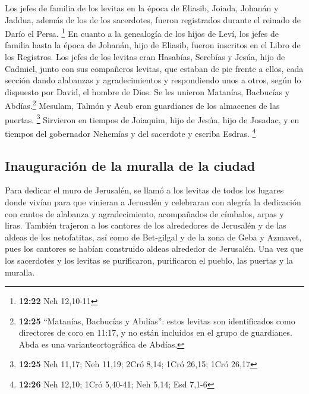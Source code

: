  Los jefes de familia de los levitas en la época de
Eliasib, Joiada, Johanán y Jaddua, además de los de los sacerdotes,
fueron registrados durante el reinado de Darío el Persa. \footnote{\textbf{12:22}
  Neh 12,10-11}  En cuanto a la genealogía de los hijos
de Leví, los jefes de familia hasta la época de Johanán, hijo de
Eliasib, fueron inscritos en el Libro de los Registros. 
Los jefes de los levitas eran Hasabías, Serebías y Jesúa, hijo de
Cadmiel, junto con sus compañeros levitas, que estaban de pie frente a
ellos, cada sección dando alabanzas y agradecimientos y respondiendo
unos a otros, según lo dispuesto por David, el hombre de Dios.
 Se les unieron Matanías, Bacbucías y Abdías.\footnote{\textbf{12:25}
  ``Matanías, Bacbucías y Abdías'': estos levitas son identificados como
  directores de coro en 11:17, y no están incluidos en el grupo de
  guardianes. Abda es una varianteortográfica de Abdías.} Mesulam,
Talmón y Acub eran guardianes de los almacenes de las puertas.
\footnote{\textbf{12:25} Neh 11,17; Neh 11,19; 2Cró 8,14; 1Cró 26,15;
  1Cró 26,17}  Sirvieron en tiempos de Joiaquim, hijo de
Jesúa, hijo de Josadac, y en tiempos del gobernador Nehemías y del
sacerdote y escriba Esdras. \footnote{\textbf{12:26} Neh 12,10; 1Cró
  5,40-41; Neh 5,14; Esd 7,1-6}

\hypertarget{inauguraciuxf3n-de-la-muralla-de-la-ciudad}{%
\subsection{Inauguración de la muralla de la
ciudad}\label{inauguraciuxf3n-de-la-muralla-de-la-ciudad}}

 Para dedicar el muro de Jerusalén, se llamó a los
levitas de todos los lugares donde vivían para que vinieran a Jerusalén
y celebraran con alegría la dedicación con cantos de alabanza y
agradecimiento, acompañados de címbalos, arpas y liras. 
También trajeron a los cantores de los alrededores de Jerusalén y de las
aldeas de los netofatitas,  así como de Bet-gilgal y de
la zona de Geba y Azmavet, pues los cantores se habían construido aldeas
alrededor de Jerusalén.  Una vez que los sacerdotes y los
levitas se purificaron, purificaron el pueblo, las puertas y la muralla.

